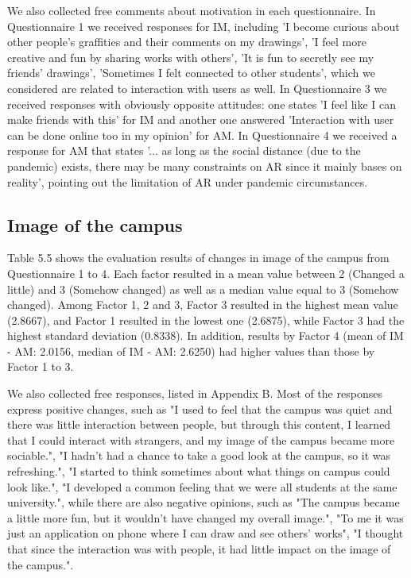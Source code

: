 We also collected free comments about motivation in each questionnaire. In Questionnaire 1 we received responses for IM, including 'I become curious about other people's graffities and their comments on my drawings',
'I feel more creative and fun by sharing works with others', 'It is fun to secretly see my friends' drawings', 'Sometimes I felt connected to other students',
which we considered are related to interaction with users as well.
In Questionnaire 3 we received responses with obviously opposite attitudes: one states 'I feel like I can make friends with this' for IM and another one answered 'Interaction with user can be done online too in my opinion' for AM.
In Questionnaire 4 we received a response for AM that states '... as long as the social distance (due to the pandemic) exists, there may be many constraints on AR since it mainly bases on reality',
pointing out the limitation of AR under pandemic circumstances.

\subsection{Image of the campus}

Table 5.5 shows the evaluation results of changes in image of the campus from Questionnaire 1 to 4.
Each factor resulted in a mean value between 2 (Changed a little) and 3 (Somehow changed) as well as a median value equal to 3 (Somehow changed).
Among Factor 1, 2 and 3, Factor 3 resulted in the highest mean value (2.8667), and Factor 1 resulted in the lowest one (2.6875),
while Factor 3 had the highest standard deviation (0.8338).
In addition, results by Factor 4 (mean of IM - AM: 2.0156, median of IM - AM: 2.6250) had higher values than those by Factor 1 to 3.

We also collected free responses, listed in Appendix B. Most of the responses express positive changes, such as "I used to feel that the campus was quiet and there was little interaction between people, but through this content, I learned that I could interact with strangers, and my image of the campus became more sociable.",
"I hadn't had a chance to take a good look at the campus, so it was refreshing.", "I started to think sometimes about what things on campus could look like.", "I developed a common feeling that we were all students at the same university.",
while there are also negative opinions, such as "The campus became a little more fun, but it wouldn't have changed my overall image.", "To me it was just an application on phone where I can draw and see others' works", "I thought that since the interaction was with people, it had little impact on the image of the campus.".

